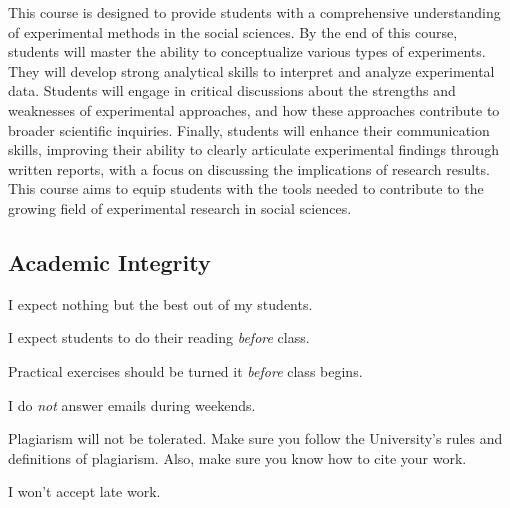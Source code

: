 \documentclass[letterpaper]{article}
\renewenvironment{itemize}{
  \begin{list}{}{
    \setlength{\leftmargin}{1.5em}
  }
}{
  \end{list}
}
\begin{document}
This course is designed to provide students with a comprehensive understanding of experimental methods in the social sciences. By the end of this course, students will master the ability to conceptualize various types of experiments. They will develop strong analytical skills to interpret and analyze experimental data. Students will engage in critical discussions about the strengths and weaknesses of experimental approaches, and how these approaches contribute to broader scientific inquiries. Finally, students will enhance their communication skills, improving their ability to clearly articulate experimental findings through written reports, with a focus on discussing the implications of research results. This course aims to equip students with the tools needed to contribute to the growing field of experimental research in social sciences.



\subsection*{Academic Integrity}

I expect nothing but the best out of my students. 

\begin{itemize}
     \item[$\circ$] I expect students to do their reading \emph{before} class.
     \item[$\circ$] Practical exercises should be turned it \emph{before} class begins. 

  \item[$\circ$] I do \emph{not} answer emails during weekends. 
\end{itemize}


\begin{itemize}
  \item[{\color{red}\Pointinghand}] Plagiarism will not be tolerated. Make sure you follow the University's rules and definitions of plagiarism. Also, make sure you know how to cite your work. 

  \item[{\color{red}\Pointinghand}] I won't accept late work.

\end{itemize}
\end{document}
